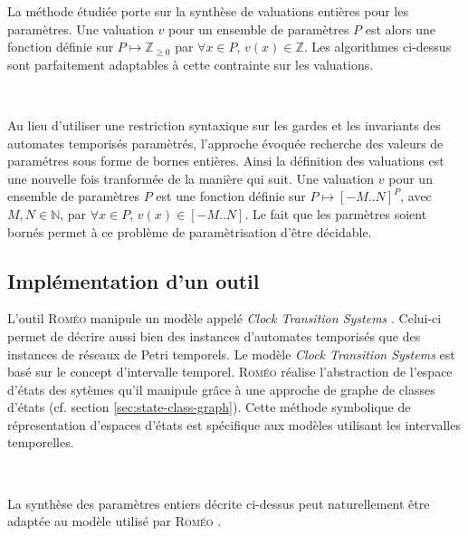         \vspace{1em}

        La méthode étudiée porte sur la synthèse de valuations entières pour les
        paramètres. Une valuation $v$ pour un ensemble de paramètres $P$ est
        alors une fonction définie sur $P \mapsto \mathbb{Z}_{\geq 0}$ par
        $\forall x \in P$, $v(x) \in \mathbb{Z}$. Les algorithmes ci-dessus sont
        parfaitement adaptables à cette contrainte sur les valuations.


        ~

        Au lieu d'utiliser une restriction syntaxique sur les gardes et les
        invariants des automates temporisés paramètrés, l'approche évoquée
        recherche des valeurs de paramétres sous forme de bornes entières. Ainsi
        la définition des valuations est une nouvelle fois tranformée de la
        manière qui suit. Une valuation $v$ pour un ensemble de paramètres $P$
        est une fonction définie sur $P \mapsto [-M..N]^P$, avec $M, N \in
        \mathbb{N}$, par $\forall x \in P$, $v(x) \in [-M..N]$. Le fait que les
        parmètres soient bornés permet à ce problème de paramètrisation d'être
        décidable.

    \subsection{Implémentation d'un outil}
    
      L'outil \textsc{Roméo} \cite{gardey05} manipule un modèle appelé {\it
        Clock Transition Systems} \cite{lime12}. Celui-ci permet de décrire
      aussi bien des instances d'automates temporisés que des instances de
      réseaux de Petri temporels. Le modèle {\it Clock Transition Systems} est
      basé sur le concept d'intervalle temporel. \textsc{Roméo}
      réalise l'abstraction de l'espace d'états des sytèmes qu'il manipule grâce
      à une approche de graphe de classes d'états (cf. section
      \ref{sec:state-class-graph}). Cette méthode symbolique de
      répresentation d'espaces d'états est spécifique aux modèles utilisant les
      intervalles temporelles.

      ~

      La synthèse des paramètres entiers décrite ci-dessus peut naturellement
      être adaptée au modèle utilisé par \textsc{Roméo} \cite{jovanovic14}.

